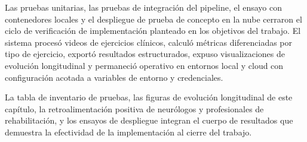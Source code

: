 Las pruebas unitarias, las pruebas de integración del pipeline, el ensayo con contenedores locales y el despliegue de prueba de concepto en la nube cerraron el ciclo de verificación de implementación planteado en los objetivos del trabajo. El sistema procesó videos de ejercicios clínicos, calculó métricas diferenciadas por tipo de ejercicio, exportó resultados estructurados, expuso visualizaciones de evolución longitudinal y permaneció operativo en entornos local y cloud con configuración acotada a variables de entorno y credenciales.

La tabla de inventario de pruebas, las figuras de evolución longitudinal de este capítulo, la retroalimentación positiva de neurólogos y profesionales de rehabilitación, y los ensayos de despliegue integran el cuerpo de resultados que demuestra la efectividad de la implementación al cierre del trabajo.
